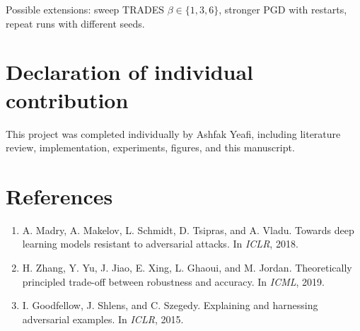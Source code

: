 \documentclass{article}
\begin{document}
Possible extensions: sweep TRADES $\beta\in\{1,3,6\}$, stronger PGD with restarts, repeat runs with different seeds.

\section{Declaration of individual contribution}
This project was completed individually by Ashfak Yeafi, including literature review, implementation, experiments, figures, and this manuscript.

\section*{References}
{\small
\begin{enumerate}
\item A. Madry, A. Makelov, L. Schmidt, D. Tsipras, and A. Vladu. Towards deep learning models resistant to adversarial attacks. In \textit{ICLR}, 2018.
\item H. Zhang, Y. Yu, J. Jiao, E. Xing, L. Ghaoui, and M. Jordan. Theoretically principled trade-off between robustness and accuracy. In \textit{ICML}, 2019.
\item I. Goodfellow, J. Shlens, and C. Szegedy. Explaining and harnessing adversarial examples. In \textit{ICLR}, 2015.
\end{enumerate}
}
\end{document}

